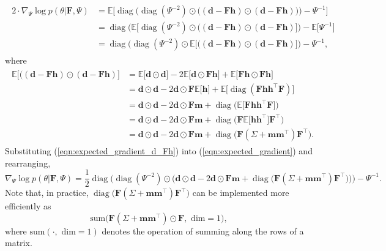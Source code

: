 \documentclass[msc,deptreport.inf]{infthesis} %
\newcommand{\matr}[1]{\mathbf{#1}}
\newcommand{\E}{\mathbb E}
\newcommand{\diag}{\mathop{\mathrm{diag}}}
\begin{document}
\begin{align}\label{eqn:expected_gradient}
\begin{split}
	2 \cdot \nabla_{\Psi} \log p(\theta | \matr{F}, \Psi) 
	& = \E \Big[ \diag\Big(\diag(\Psi^{-2}) \odot \big((\matr{d} - \matr{Fh}) \odot (\matr{d} - \matr{Fh})\big)\Big) - \Psi^{-1} \Big] \\
	& = \diag\Big(\E \big[\diag(\Psi^{-2}) \odot \big((\matr{d} - \matr{Fh}) \odot (\matr{d} - \matr{Fh})\big]\Big) - \E \big[ \Psi^{-1} \big] \\
	& = \diag\Big(\diag(\Psi^{-2}) \odot \E \big[\big((\matr{d} - \matr{Fh}) \odot (\matr{d} - \matr{Fh})\big]\Big) - \Psi^{-1},
\end{split}
\end{align} 
where
\begin{align}\label{eqn:expected_gradient_d_Fh}
\begin{split}
	\E \big[\big((\matr{d} - \matr{Fh}) \odot (\matr{d} - \matr{Fh})\big] 
	& = \E \big[\matr{d} \odot \matr{d} \big] - 2\E \big[ \matr{d} \odot \matr{Fh} \big] + \E \big[ \matr{Fh} \odot \matr{Fh} \big] \\
	& = \matr{d} \odot \matr{d} - 2\matr{d} \odot \matr{F} \E \big[ \matr{h} \big] + \E \big[ \diag(\matr{Fhh^\intercal F}) \big] \\
	& = \matr{d} \odot \matr{d} - 2\matr{d} \odot \matr{F} \matr{m} + \diag\big(\E \big[ \matr{Fhh^\intercal F} \big]\big) \\
	& = \matr{d} \odot \matr{d} - 2\matr{d} \odot \matr{F} \matr{m} + \diag\big( \matr{F} \E \big[ \matr{hh^\intercal} \big] \matr{F}^\intercal \big) \\
	& = \matr{d} \odot \matr{d} - 2\matr{d} \odot \matr{F} \matr{m} + \diag\big( \matr{F} (\Sigma + \matr{m} \matr{m}^\intercal) \matr{F}^\intercal \big).
\end{split}
\end{align} 
Substituting (\ref{eqn:expected_gradient_d_Fh}) into (\ref{eqn:expected_gradient}) and rearranging, 
\begin{equation}
	\nabla_{\Psi} \log p(\theta | \matr{F}, \Psi) 
	= \frac{1}{2} \diag\Big(\diag(\Psi^{-2}) \odot \big(\matr{d} \odot \matr{d} - 2\matr{d} \odot \matr{F} \matr{m} + \diag\big( \matr{F} (\Sigma + \matr{m} \matr{m}^\intercal) \matr{F}^\intercal \big)\big) \Big) - \Psi^{-1}.
\end{equation}
Note that, in practice, $\diag\big( \matr{F} (\Sigma + \matr{m} \matr{m}^\intercal) \matr{F}^\intercal \big)$ can be implemented more efficiently as
\begin{equation}
 	\text{sum}\big(\matr{F} (\Sigma + \matr{m} \matr{m}^\intercal) \odot \matr{F}, \text{ dim} = 1\big),
\end{equation}
where $\text{sum}(\cdot, \text{ dim} = 1)$ denotes the operation of summing along the rows of a matrix. 
\end{document}

